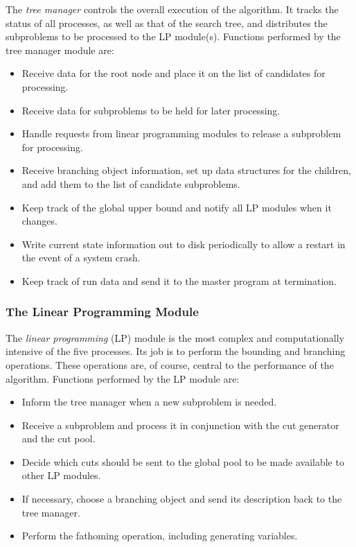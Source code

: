 The {\em tree manager} controls the overall execution of the algorithm. It
tracks the status of all processes, as well as that of the search
tree, and distributes the subproblems to be processed to the LP
module(s). Functions performed by the tree manager module are:
\begin{itemize}
        \item Receive data for the root node and place it on the list 
        of candidates for processing.
        \item Receive data for subproblems to be held for later
        processing.
        \item Handle requests from linear programming modules to
        release a subproblem for processing.
        \item Receive branching object information, set up data structures
        for the children, and add them to the list of candidate subproblems.
        \item Keep track of the global upper bound and notify all LP
        modules when it changes.
        \item Write current state information out to disk periodically
        to allow a restart in the event of a system crash.
        \item Keep track of run data and send it to the master
        program at termination.
\end{itemize} 

\subsubsection{The Linear Programming Module}

The {\em linear programming} (LP) module is the most complex and
computationally intensive of the five processes. Its job is to perform
the bounding and branching operations. These operations
are, of course, central to the performance of the algorithm. Functions
performed by the LP module are:
\begin{itemize}
        \item Inform the tree manager when a new subproblem is needed.
        \item Receive a subproblem and process it in conjunction
        with the cut generator and the cut pool.
        \item Decide which cuts should be sent to the global pool to
        be made available to other LP modules.
        \item If necessary, choose a branching object and send its
        description back to the tree manager.
        \item Perform the fathoming operation, including generating
        variables. 
\end{itemize} 

